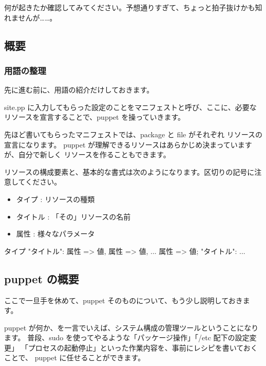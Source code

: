 \documentclass[mingoth,a4paper]{jsarticle}
\begin{document}

何が起きたか確認してみてください。予想通りすぎて、ちょっと拍子抜けかも知
れませんが……。

\newpage
\subsection{概要}

\subsubsection{用語の整理}

先に進む前に、用語の紹介だけしておきます。

site.pp に入力してもらった設定のことをマニフェストと呼び、ここに、必要な
リソースを宣言することで、puppet を操っていきます。

先ほど書いてもらったマニフェストでは、package と file がそれぞれ
リソースの宣言になります。
puppet が理解できるリソースはあらかじめ決まっていますが、自分で新しく
リソースを作ることもできます。

リソースの構成要素と、基本的な書式は次のようになります。区切りの記号に注意してください。

\begin{itemize}
 \item タイプ : リソースの種類
 \item タイトル : 「その」リソースの名前
 \item 属性 : 様々なパラメータ
\end{itemize}

\begin{commandline}
タイプ {
  "タイトル":
    属性 => 値,
    属性 => 値,
    ...
    属性 => 値;
  "タイトル":
    ...
}
\end{commandline}

\subsection{puppet の概要}

ここで一旦手を休めて、puppet そのものについて、もう少し説明しておきます。

puppet が何か、を一言でいえば、システム構成の管理ツールということになります。
普段、sudo を使ってやるような「パッケージ操作」「/etc 配下の設定変更」
「プロセスの起動停止」といった作業内容を、事前にレシピを書いておくことで、
puppet に任せることができます。
\end{document}
